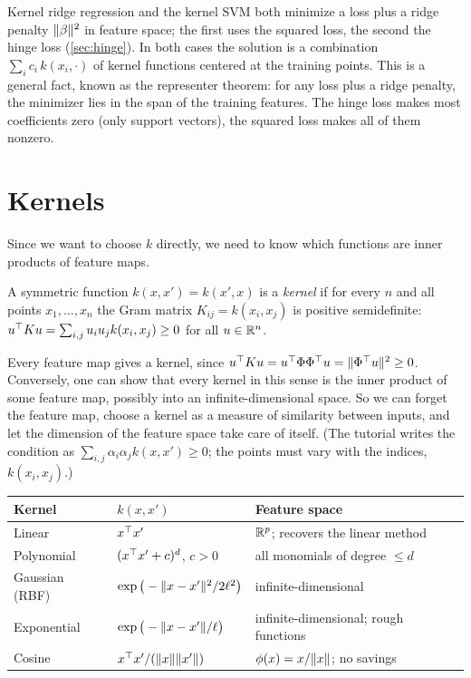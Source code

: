 \begin{remark}
Kernel ridge regression and the kernel SVM both minimize a loss plus a ridge penalty $\lVert \beta\rVert^2$ in feature space; the first uses the squared loss, the second the hinge loss (\cref{sec:hinge}). In both cases the solution is a combination $\sum_ic_i\,k(x_i,\cdot)$ of kernel functions centered at the training points. This is a general fact, known as the representer theorem: for any loss plus a ridge penalty, the minimizer lies in the span of the training features. The hinge loss makes most coefficients zero (only support vectors), the squared loss makes all of them nonzero.
\end{remark}

\section{Kernels}\label{sec:kernel-examples}

Since we want to choose $k$ directly, we need to know which functions are inner products of feature maps.

\begin{definition}
A symmetric function $k(x,x')=k(x',x)$ is a \emph{kernel} if for every $n$ and all points $x_1,\dots,x_n$ the Gram matrix $K_{ij}=k(x_i,x_j)$ is positive semidefinite: $u^{\top} Ku=\sum_{i,j}u_iu_jk(x_i,x_j)\ge0$ for all $u\in\mathbb{R}^n$.
\end{definition}

Every feature map gives a kernel, since $u^{\top} Ku=u^{\top}\Phi\Phi^{\top} u=\lVert \Phi^{\top} u\rVert^2\ge0$. Conversely, one can show that every kernel in this sense is the inner product of some feature map, possibly into an infinite-dimensional space. So we can forget the feature map, choose a kernel as a measure of similarity between inputs, and let the dimension of the feature space take care of itself. (The tutorial writes the condition as $\sum_{i,j}\alpha_i\alpha_jk(x,x')\ge0$; the points must vary with the indices, $k(x_i,x_j)$.)

\begin{center}
\small
\begin{tabularx}{\textwidth}{@{}l>{\raggedright\arraybackslash}X>{\raggedright\arraybackslash}X@{}}
\toprule
Kernel & $k(x,x')$ & Feature space \\
\midrule
Linear & $x^{\top} x'$ & $\mathbb{R}^p$; recovers the linear method \\
Polynomial & $(x^{\top} x'+c)^d$, $c>0$ & all monomials of degree $\le d$ \\
Gaussian (RBF) & $\exp\big(-\lVert x-x'\rVert^2/2\ell^2\big)$ & infinite-dimensional \\
Exponential & $\exp\big(-\lVert x-x'\rVert/\ell\big)$ & infinite-dimensional; rough functions \\
Cosine & $x^{\top} x'/(\lVert x\rVert\lVert x'\rVert)$ & $\phi(x)=x/\lVert x\rVert$; no savings \\
\bottomrule
\end{tabularx}
\end{center}

